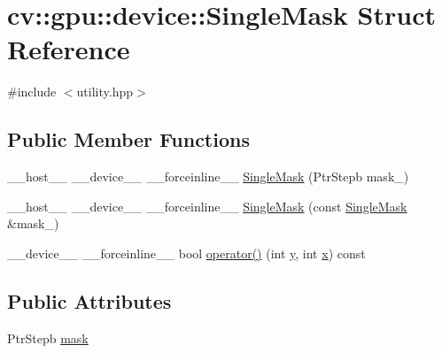 \hypertarget{structcv_1_1gpu_1_1device_1_1SingleMask}{\section{cv\-:\-:gpu\-:\-:device\-:\-:Single\-Mask Struct Reference}
\label{structcv_1_1gpu_1_1device_1_1SingleMask}
}


{\ttfamily \#include $<$utility.\-hpp$>$}

\subsection*{Public Member Functions}
\begin{DoxyCompactItemize}
\item 
\-\_\-\-\_\-host\-\_\-\-\_\- \-\_\-\-\_\-device\-\_\-\-\_\- \-\_\-\-\_\-forceinline\-\_\-\-\_\- \hyperlink{structcv_1_1gpu_1_1device_1_1SingleMask_a73c587477a8a9d191bc739cde7f87344}{Single\-Mask} (Ptr\-Stepb mask\-\_\-)
\item 
\-\_\-\-\_\-host\-\_\-\-\_\- \-\_\-\-\_\-device\-\_\-\-\_\- \-\_\-\-\_\-forceinline\-\_\-\-\_\- \hyperlink{structcv_1_1gpu_1_1device_1_1SingleMask_aeb607adbe2ff909fe73cf15972115b1a}{Single\-Mask} (const \hyperlink{structcv_1_1gpu_1_1device_1_1SingleMask}{Single\-Mask} \&mask\-\_\-)
\item 
\-\_\-\-\_\-device\-\_\-\-\_\- \-\_\-\-\_\-forceinline\-\_\-\-\_\- bool \hyperlink{structcv_1_1gpu_1_1device_1_1SingleMask_a326150db077b05e69b2b8cba1f1a844b}{operator()} (int \hyperlink{highgui__c_8h_af1202c02b14870c18fb3a1da73e9e7c7}{y}, int \hyperlink{highgui__c_8h_a6150e0515f7202e2fb518f7206ed97dc}{x}) const 
\end{DoxyCompactItemize}
\subsection*{Public Attributes}
\begin{DoxyCompactItemize}
\item 
Ptr\-Stepb \hyperlink{structcv_1_1gpu_1_1device_1_1SingleMask_a09f832977c0832e0a149262ae46cb9dc}{mask}
\end{DoxyCompactItemize}


